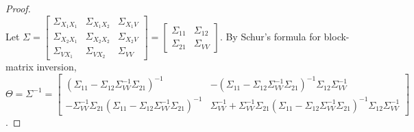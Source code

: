 \begin{proof}
\begin{equation}
    \end{equation}
    Let $\Sigma=\begin{bmatrix}
        \Sigma_{X_1X_1} & \Sigma_{X_1X_2} & \Sigma_{X_1V} \\
        \Sigma_{X_2X_1} & \Sigma_{X_2X_2} & \Sigma_{X_2V} \\
        \Sigma_{VX_1} & \Sigma_{VX_2} & \Sigma_{VV}
    \end{bmatrix}=\begin{bmatrix}
        \Sigma_{11} & \Sigma_{12} \\
        \Sigma_{21} & \Sigma_{VV}   
    \end{bmatrix}$. By Schur's formula for block-matrix inversion, 
    $\Theta=\Sigma^{-1}=\begin{bmatrix}
        (\Sigma_{11}-\Sigma_{12}\Sigma_{VV}^{-1}\Sigma_{21})^{-1} & -(\Sigma_{11}-\Sigma_{12}\Sigma_{VV}^{-1}\Sigma_{21})^{-1}\Sigma_{12}\Sigma_{VV}^{-1} \\
        -\Sigma_{VV}^{-1}\Sigma_{21}(\Sigma_{11}-\Sigma_{12}\Sigma_{VV}^{-1}\Sigma_{21})^{-1} & \Sigma_{VV}^{-1}+\Sigma_{VV}^{-1}\Sigma_{21}(\Sigma_{11}-\Sigma_{12}\Sigma_{VV}^{-1}\Sigma_{21})^{-1}\Sigma_{12}\Sigma_{VV}^{-1}
    \end{bmatrix}$.


\end{proof}
